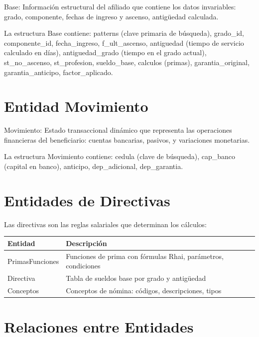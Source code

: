 Base: Información estructural del afiliado que contiene los datos invariables: grado, componente, fechas de ingreso y ascenso, antigüedad calculada.

\bigskip

La estructura Base contiene: patterns (clave primaria de búsqueda), grado\_id, componente\_id, fecha\_ingreso, f\_ult\_ascenso, antiguedad (tiempo de servicio calculado en días), antiguedad\_grado (tiempo en el grado actual), st\_no\_ascenso, st\_profesion, sueldo\_base, calculos (primas), garantia\_original, garantia\_anticipo, factor\_aplicado.

\bigskip

\section{Entidad Movimiento}

Movimiento: Estado transaccional dinámico que representa las operaciones financieras del beneficiario: cuentas bancarias, pasivos, y variaciones monetarias.

\bigskip

La estructura Movimiento contiene: cedula (clave de búsqueda), cap\_banco (capital en banco), anticipo, dep\_adicional, dep\_garantia.

\bigskip

\section{Entidades de Directivas}

Las directivas son las reglas salariales que determinan los cálculos:

\bigskip

\begin{center}
\begin{tabular}{llp{8cm}}
\toprule
\textbf{Entidad} & \textbf{Descripción} \\
\midrule
PrimasFunciones & Funciones de prima con fórmulas Rhai, parámetros, condiciones \\
Directiva & Tabla de sueldos base por grado y antigüedad \\
Conceptos & Conceptos de nómina: códigos, descripciones, tipos \\
\bottomrule
\end{tabular}
\end{center}

\bigskip

\section{Relaciones entre Entidades}

